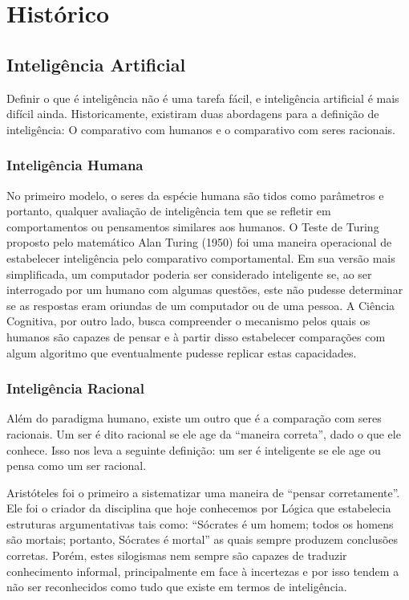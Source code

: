 \chapter{Histórico}

\section{Inteligência Artificial}

Definir o que é inteligência não é uma tarefa fácil, e inteligência artificial
é mais difícil ainda. Historicamente, existiram duas abordagens para a
definição de inteligência: O comparativo com humanos e o comparativo com seres
racionais.

\subsection{Inteligência Humana}

No primeiro modelo, o seres da espécie humana são tidos como parâmetros e
portanto, qualquer avaliação de inteligência tem que se refletir em
comportamentos ou pensamentos similares aos humanos. O Teste de Turing proposto
pelo matemático Alan Turing (1950) foi uma maneira operacional de estabelecer
inteligência pelo comparativo comportamental. Em sua versão mais simplificada,
um computador poderia ser considerado inteligente se, ao ser interrogado por um
humano com algumas questões, este não pudesse determinar se as respostas eram
oriundas de um computador ou de uma pessoa. A Ciência Cognitiva, por outro
lado, busca compreender o mecanismo pelos quais os humanos são capazes de
pensar e à partir disso estabelecer comparações com algum algoritmo que
eventualmente pudesse replicar estas capacidades.

\subsection{Inteligência Racional}

Além do paradigma humano, existe um outro que é a comparação com seres
racionais. Um ser é dito racional se ele age da ``maneira correta'', dado o que
ele conhece. Isso nos leva a seguinte definição: um ser é inteligente se ele
age ou pensa como um ser racional.

Aristóteles foi o primeiro a sistematizar uma maneira de ``pensar
corretamente''.  Ele foi o criador da disciplina que hoje conhecemos por Lógica
que estabelecia estruturas argumentativas tais como: ``Sócrates é um homem;
todos os homens são mortais; portanto, Sócrates é mortal'' as quais sempre
produzem conclusões corretas. Porém, estes silogismas nem sempre são capazes de
traduzir conhecimento informal, principalmente em face à incertezas e por isso
tendem a não ser reconhecidos como tudo que existe em termos de inteligência.

